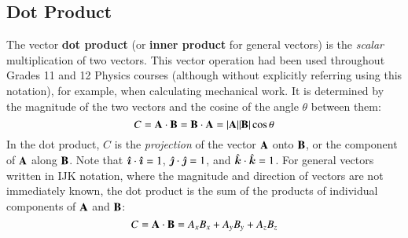 \documentclass{../../../oss-handout}
\newcommand{\mb}[1]{\ensuremath\mathbf{#1}}
\newcommand{\iii}{\ensuremath\hat{\bm{\imath}}}
\newcommand{\jjj}{\ensuremath\hat{\bm{\jmath}}}
\newcommand{\kkk}{\ensuremath\hat{\bm{k}}}
\begin{document}
\subsection{Dot Product}
The vector \textbf{dot product} (or \textbf{inner product} for general vectors)
is the \emph{scalar} multiplication of two vectors. This vector operation had
been used throughout Grades 11 and 12 Physics courses (although without
explicitly referring using this notation), for example, when calculating
mechanical work. It is determined by the magnitude of the two vectors and the
cosine of the angle $\theta$ between them:
\begin{equation*}
  C=\mb{A}\cdot\mb{B}=\mb{B}\cdot\mb{A}=|\mb{A}||\mb{B}|\cos\theta
\end{equation*}
In the dot product, $C$ is the \emph{projection} of the vector $\mb{A}$ onto
$\mb{B}$, or the component of $\mb{A}$ along $\mb{B}$. Note that
$\iii\cdot\iii=1$, $\jjj\cdot\jjj=1$, and $\kkk\cdot\kkk=1$. For general
vectors written in IJK notation, where the magnitude and direction of vectors
are not immediately known, the dot product is the sum of the products of
individual components of $\mb{A}$ and $\mb{B}$:
\begin{equation*}
  C=\mb{A}\cdot\mb{B}=A_xB_x+A_yB_y+A_zB_z
\end{equation*}
\end{document}
